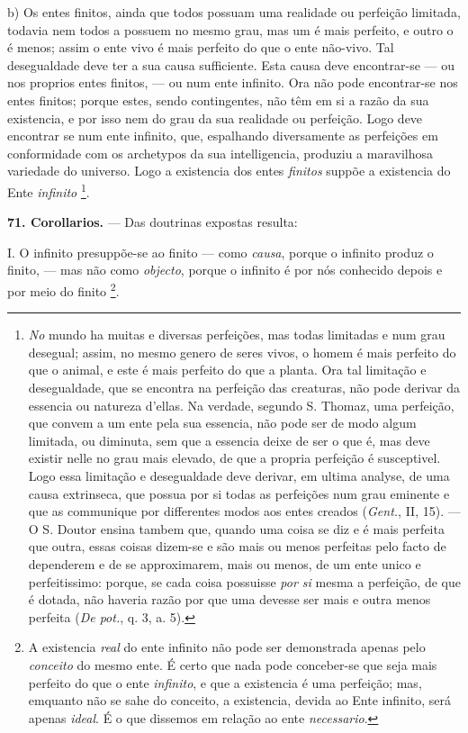  b) Os entes finitos, ainda que todos possuam uma realidade ou perfeição limitada, todavia nem todos a possuem no mesmo grau, mas um é mais perfeito, e outro o é menos; assim o ente vivo é mais perfeito do que o ente não-vivo. Tal desegualdade deve ter a sua causa sufficiente. Esta causa deve encontrar-se --- ou nos proprios entes finitos, --- ou num ente infinito. Ora não pode encontrar-se nos entes finitos; porque estes, sendo contingentes, não têm em si a razão da sua existencia, e por isso nem do grau da sua realidade ou perfeição. Logo deve encontrar se num ente infinito, que, espalhando diversamente as perfeições em conformidade com os archetypos da sua intelligencia, produziu a maravilhosa variedade do universo. Logo a existencia dos entes \emph{finitos} suppõe a existencia do Ente \emph{infinito} \footnote{\emph{No} mundo ha muitas e diversas perfeições, mas todas limitadas e num grau desegual; assim, no mesmo genero de seres vivos, o homem é mais perfeito do que o animal, e este é mais perfeito do que a planta. Ora tal limitação e desegualdade, que se encontra na perfeição das creaturas, não pode derivar da essencia ou natureza d'ellas. Na verdade, segundo S. Thomaz, uma perfeição, que convem a um ente pela sua essencia, não pode ser de modo algum limitada, ou diminuta, sem que a essencia deixe de ser o que é, mas deve existir nelle no grau mais elevado, de que a propria perfeição é susceptivel. Logo essa limitação e desegualdade deve derivar, em ultima analyse, de uma causa extrinseca, que possua por si todas as perfeições num grau eminente e que as communique por differentes modos aos entes creados (\emph{Gent.}, II, 15). --- O S. Doutor ensina tambem que, quando uma coisa se diz e é mais perfeita que outra, essas coisas dizem-se e são mais ou menos perfeitas pelo facto de dependerem e de se approximarem, mais ou menos, de um ente unico e perfeitissimo: porque, se cada coisa possuisse \emph{por si} mesma a perfeição, de que é dotada, não haveria razão por que uma devesse ser mais e outra menos perfeita (\emph{De pot.}, q. 3, a. 5).}.

\textbf{71. Corollarios.} --- Das doutrinas expostas resulta:

I. O infinito presuppõe-se ao finito --- como \emph{causa}, porque o infinito produz o finito, --- mas não como \emph{objecto}, porque o infinito é por nós conhecido depois e por meio do finito \footnote{A existencia \emph{real} do ente infinito não pode ser demonstrada apenas pelo \emph{conceito} do mesmo ente. É certo que nada pode conceber-se que seja mais perfeito do que o ente \emph{infinito}, e que a existencia é uma perfeição; mas, emquanto não se sahe do conceito, a existencia, devida ao Ente infinito, será apenas \emph{ideal}. É o que dissemos em relação ao ente \emph{necessario}.}.


